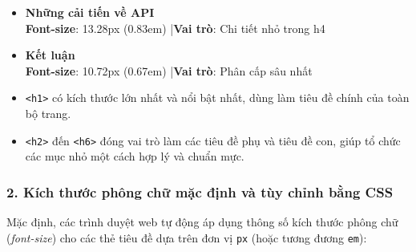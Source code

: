 \documentclass[11pt,oneside]{book}
\newcommand{\codeinline}[1]{\textcolor{accentOrange}{\texttt{#1}}}
\begin{document}
\begin{tcolorbox}
\begin{itemize}[leftmargin=0pt, label={}, itemsep=10pt, parsep=0pt]
    \item {\fontsize{9.5pt}{12pt}\selectfont\sffamily\bfseries\color{darkText} Những cải tiến về API}\\[3pt]
           \hfill {\scriptsize\color{codeComment}\textbf{Font-size}: 13.28px (0.83em) \quad|\quad \textbf{Vai trò}: Chi tiết nhỏ trong h4}

    \item {\fontsize{8.5pt}{11pt}\selectfont\sffamily\bfseries\color{codeComment} Kết luận}\\[3pt]
           \hfill {\scriptsize\color{codeComment}\textbf{Font-size}: 10.72px (0.67em) \quad|\quad \textbf{Vai trò}: Phân cấp sâu nhất}
\end{itemize}
\end{tcolorbox}

\begin{noteBox}
\begin{itemize}[leftmargin=1.5em, itemsep=2pt, parsep=0pt]
    \item \codeinline{<h1>} có kích thước lớn nhất và nổi bật nhất, dùng làm tiêu đề chính của toàn bộ trang.
    \item \codeinline{<h2>} đến \codeinline{<h6>} đóng vai trò làm các tiêu đề phụ và tiêu đề con, giúp tổ chức các mục nhỏ một cách hợp lý và chuẩn mực.
\end{itemize}
\end{noteBox}

\subsubsection{2. Kích thước phông chữ mặc định và tùy chỉnh bằng CSS}

Mặc định, các trình duyệt web tự động áp dụng thông số kích thước phông chữ (\textit{font-size}) cho các thẻ tiêu đề dựa trên đơn vị \codeinline{px} (hoặc tương đương \codeinline{em}):
\end{document}
